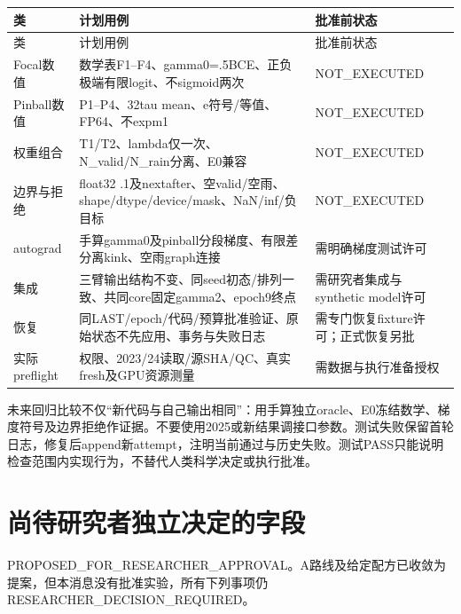 \documentclass[UTF8,fontset=fandol,10pt]{ctexart}
\begin{document}
\begingroup\small\setlength{\tabcolsep}{3pt}\renewcommand{\arraystretch}{1.12}
\begin{longtable}{>{\raggedright\arraybackslash}p{\dimexpr(\linewidth-6\tabcolsep)/3\relax}>{\raggedright\arraybackslash}p{\dimexpr(\linewidth-6\tabcolsep)/3\relax}>{\raggedright\arraybackslash}p{\dimexpr(\linewidth-6\tabcolsep)/3\relax}}
\toprule
类 & 计划用例 & 批准前状态 \\
\midrule\endfirsthead
类 & 计划用例 & 批准前状态 \\
\midrule\endhead
Focal数值 & 数学表F1–F4、gamma0=.5BCE、正负极端有限logit、不sigmoid两次 & NOT\_\allowbreak{}EXECUTED \\
Pinball数值 & P1–P4、32tau mean、e符号/\allowbreak{}等值、FP64、不expm1 & NOT\_\allowbreak{}EXECUTED \\
权重组合 & T1/\allowbreak{}T2、lambda仅一次、N\_\allowbreak{}valid/\allowbreak{}N\_\allowbreak{}rain分离、E0兼容 & NOT\_\allowbreak{}EXECUTED \\
边界与拒绝 & float32 .1及nextafter、空valid/\allowbreak{}空雨、shape/\allowbreak{}dtype/\allowbreak{}device/\allowbreak{}mask、NaN/\allowbreak{}inf/\allowbreak{}负目标 & NOT\_\allowbreak{}EXECUTED \\
autograd & 手算gamma0及pinball分段梯度、有限差分离kink、空雨graph连接 & 需明确梯度测试许可 \\
集成 & 三臂输出结构不变、同seed初态/\allowbreak{}排列一致、共同core固定gamma2、epoch9终点 & 需研究者集成与synthetic model许可 \\
恢复 & 同LAST/\allowbreak{}epoch/\allowbreak{}代码/\allowbreak{}预算批准验证、原始状态不先应用、事务与失败日志 & 需专门恢复fixture许可；正式恢复另批 \\
实际preflight & 权限、2023/\allowbreak{}24读取/\allowbreak{}源SHA/\allowbreak{}QC、真实fresh及GPU资源测量 & 需数据与执行准备授权 \\
\bottomrule\end{longtable}\endgroup

未来回归比较不仅“新代码与自己输出相同”：用手算独立oracle、E0冻结数学、梯度符号及边界拒绝作证据。不要使用2025或新结果调接口参数。测试失败保留首轮日志，修复后append新attempt，注明当前通过与历史失败。测试PASS只能说明检查范围内实现行为，不替代人类科学决定或执行批准。
\clearpage\section{尚待研究者独立决定的字段}

PROPOSED\_\allowbreak{}FOR\_\allowbreak{}RESEARCHER\_\allowbreak{}APPROVAL。A路线及给定配方已收敛为提案，但本消息没有批准实验，所有下列事项仍RESEARCHER\_\allowbreak{}DECISION\_\allowbreak{}REQUIRED。
\end{document}
